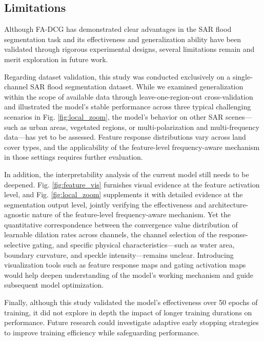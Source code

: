 \documentclass[lettersize,journal]{IEEEtran}
\begin{document}
\subsection{Limitations}

Although FA-DCG has demonstrated clear advantages in the SAR flood segmentation task and its effectiveness and generalization ability have been validated through rigorous experimental designs, several limitations remain and merit exploration in future work.

Regarding dataset validation, this study was conducted exclusively on a single-channel SAR flood segmentation dataset. While we examined generalization within the scope of available data through leave-one-region-out cross-validation and illustrated the model's stable performance across three typical challenging scenarios in Fig. \ref{fig:local_zoom}, the model's behavior on other SAR scenes---such as urban areas, vegetated regions, or multi-polarization and multi-frequency data---has yet to be assessed. Feature response distributions vary across land cover types, and the applicability of the feature-level frequency-aware mechanism in those settings requires further evaluation.

In addition, the interpretability analysis of the current model still needs to be deepened. Fig. \ref{fig:feature_vis} furnishes visual evidence at the feature activation level, and Fig. \ref{fig:local_zoom} supplements it with detailed evidence at the segmentation output level, jointly verifying the effectiveness and architecture-agnostic nature of the feature-level frequency-aware mechanism. Yet the quantitative correspondence between the convergence value distribution of learnable dilation rates across channels, the channel selection of the response-selective gating, and specific physical characteristics---such as water area, boundary curvature, and speckle intensity---remains unclear. Introducing visualization tools such as feature response maps and gating activation maps would help deepen understanding of the model's working mechanism and guide subsequent model optimization.

Finally, although this study validated the model's effectiveness over 50 epochs of training, it did not explore in depth the impact of longer training durations on performance. Future research could investigate adaptive early stopping strategies to improve training efficiency while safeguarding performance.
\end{document}
